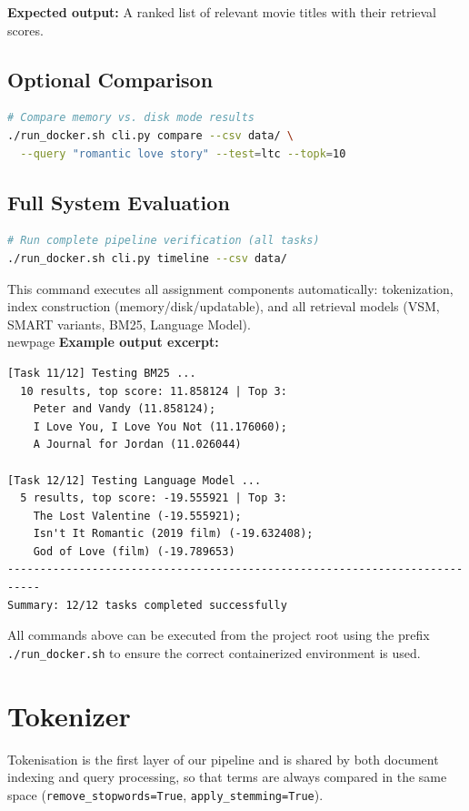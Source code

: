 \documentclass[11pt,a4paper]{article}
\begin{document}
\noindent\textbf{Expected output:}  
A ranked list of relevant movie titles with their retrieval scores.

\subsection*{Optional Comparison}
\begin{lstlisting}[language=bash]
# Compare memory vs. disk mode results
./run_docker.sh cli.py compare --csv data/ \
  --query "romantic love story" --test=ltc --topk=10
\end{lstlisting}

\subsection*{Full System Evaluation}
\begin{lstlisting}[language=bash]
# Run complete pipeline verification (all tasks)
./run_docker.sh cli.py timeline --csv data/
\end{lstlisting}

\noindent This command executes all assignment components automatically:
tokenization, index construction (memory/disk/updatable), and all retrieval models
(VSM, SMART variants, BM25, Language Model).  
\\newpage
\textbf{Example output excerpt:}
\begin{lstlisting}
[Task 11/12] Testing BM25 ...
  10 results, top score: 11.858124 | Top 3:
    Peter and Vandy (11.858124);
    I Love You, I Love You Not (11.176060);
    A Journal for Jordan (11.026044)

[Task 12/12] Testing Language Model ...
  5 results, top score: -19.555921 | Top 3:
    The Lost Valentine (-19.555921);
    Isn't It Romantic (2019 film) (-19.632408);
    God of Love (film) (-19.789653)
---------------------------------------------------------------------------
Summary: 12/12 tasks completed successfully
\end{lstlisting}

\noindent All commands above can be executed from the project root using the prefix
\texttt{./run\_docker.sh} to ensure the correct containerized environment is used.


\newpage
\section{Tokenizer}
\label{sec:tokenizer}

Tokenisation is the first layer of our pipeline and is shared by both document indexing and query processing, so that terms are always compared in the same space (\texttt{remove\_stopwords=True}, \texttt{apply\_stemming=True}).
\end{document}
